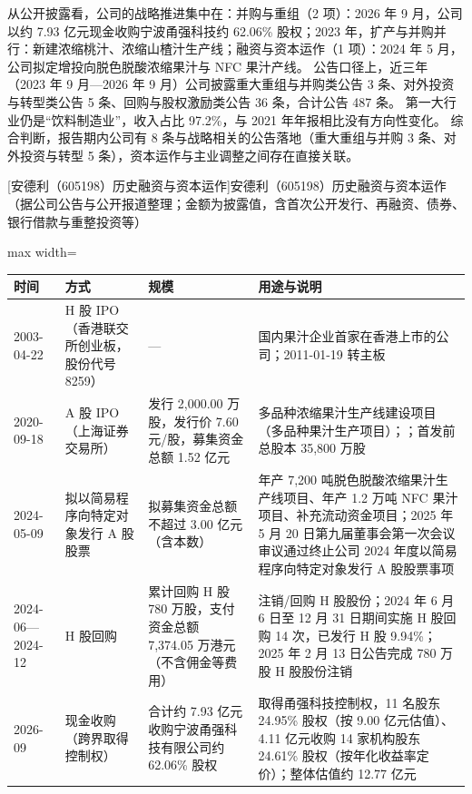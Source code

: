  从公开披露看，公司的战略推进集中在：并购与重组（2 项）：2026 年 9 月，公司以约 7.93 亿元现金收购宁波甬强科技约 62.06\% 股权；2023 年，扩产与并购并行：新建浓缩桃汁、浓缩山楂汁生产线；融资与资本运作（1 项）：2024 年 5 月，公司拟定增投向脱色脱酸浓缩果汁与 NFC 果汁产线。 公告口径上，近三年（2023 年 9 月---2026 年 9 月）公司披露重大重组与并购类公告 3 条、对外投资与转型类公告 5 条、回购与股权激励类公告 36 条，合计公告 487 条。 第一大行业仍是“饮料制造业”，收入占比 97.2\%，与 2021 年年报相比没有方向性变化。 综合判断，报告期内公司有 8 条与战略相关的公告落地（重大重组与并购 3 条、对外投资与转型 5 条），资本运作与主业调整之间存在直接关联。

\begin{center}\small\setlength{\tabcolsep}{4pt}
[安德利（605198）历史融资与资本运作]{安德利（605198）历史融资与资本运作（据公司公告与公开报道整理；金额为披露值，含首次公开发行、再融资、债券、银行借款与重整投资等）}
\begin{adjustbox}{max width=\textwidth}
\begin{tabular}{@{}p{1.45cm}p{2.55cm}p{4.05cm}p{4.95cm}@{}}
\toprule
时间 & 方式 & 规模 & 用途与说明 \\
\midrule
2003-04-22 & H 股 IPO（香港联交所创业板，股份代号 8259） & --- & 国内果汁企业首家在香港上市的公司；2011-01-19 转主板 \\
2020-09-18 & A 股 IPO（上海证券交易所） & 发行 2,\allowbreak{}000.00 万股，\allowbreak{}发行价 7.60 元/\allowbreak{}股，\allowbreak{}募集资金总额 1.52 亿元 & 多品种浓缩果汁生产线建设项目（多品种果汁生产项目）；；首发前总股本 35,\allowbreak{}800 万股 \\
2024-05-09 & 拟以简易程序向特定对象发行 A 股股票 & 拟募集资金总额不超过 3.00 亿元（含本数） & 年产 7,\allowbreak{}200 吨脱色脱酸浓缩果汁生产线项目、\allowbreak{}年产 1.2 万吨 NFC 果汁项目、\allowbreak{}补充流动资金项目；2025 年 5 月 20 日第九届董事会第一次会议审议通过终止公司 2024 年度以简易程序向特定对象发行 A 股股票事项 \\
2024-06—2024-12 & H 股回购 & 累计回购 H 股 780 万股，\allowbreak{}支付资金总额 7,\allowbreak{}374.05 万港元（不含佣金等费用） & 注销/\allowbreak{}回购 H 股股份；2024 年 6 月 6 日至 12 月 31 日期间实施 H 股回购 14 次，\allowbreak{}已发行 H 股 9.94\%；2025 年 2 月 13 日公告完成 780 万股 H 股股份注销 \\
2026-09 & 现金收购（跨界取得控制权） & 合计约 7.93 亿元收购宁波甬强科技有限公司约 62.06\% 股权 & 取得甬强科技控制权，\allowbreak{}11 名股东 24.95\% 股权（按 9.00 亿元估值）、\allowbreak{}4.11 亿元收购 14 家机构股东 24.61\% 股权（按年化收益率定价）；整体估值约 12.77 亿元 \\
\bottomrule
\end{tabular}
\end{adjustbox}
\end{center}

